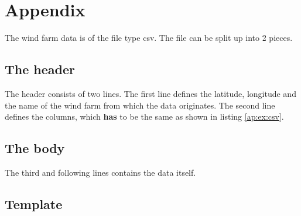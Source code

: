 %
%

\chapter{Appendix}
\label{ap:csv}
The wind farm data is of the file type csv. The file can be split up into 2 pieces.
\section*{The header}
The header consists of two lines. The first line defines the latitude, longitude and the name of the wind farm from which the data originates.
The second line defines the columns, which \textbf{has} to be the same as shown in listing \ref{ap:ex:csv}.

\section*{The body}
The third and following lines contains the data itself.

\section*{Template}

